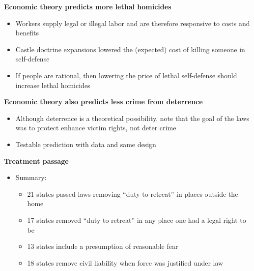 \documentclass[notes=show]{beamer}
\begin{document}
\begin{frame}[plain]
	\begin{center}
	\textbf{Economic theory predicts more lethal homicides}
	\end{center}
	
	\begin{itemize}
	\item Workers supply legal or illegal labor and are therefore responsive to costs and benefits
	\item Castle doctrine expansions lowered the (expected) cost of killing someone in self-defense
	\item If people are rational, then lowering the price of lethal self-defense should increase lethal homicides
	\end{itemize}
\end{frame}

\begin{frame}[plain]
	\begin{center}
	\textbf{Economic theory also predicts less crime from deterrence}
	\end{center}
	
	\begin{itemize}
		\item Although deterrence is a theoretical possibility, note that the goal of the laws was to protect enhance victim rights, not deter crime
		\item Testable prediction with data and same design
	\end{itemize}
\end{frame}



\begin{frame}[plain]
	\begin{center}
	\textbf{Treatment passage}
	\end{center}
	
	\begin{itemize}
	\item Summary:
		\begin{itemize}
		\item 21 states passed laws removing ``duty to retreat'' in places outside the home
		\item 17 states removed ``duty to retreat'' in any place one had a legal right to be
		\item 13 states include a presumption of reasonable fear
		\item 18 states remove civil liability when force was justified under law
		\end{itemize}
	\end{itemize}
\end{frame}
\end{document}
